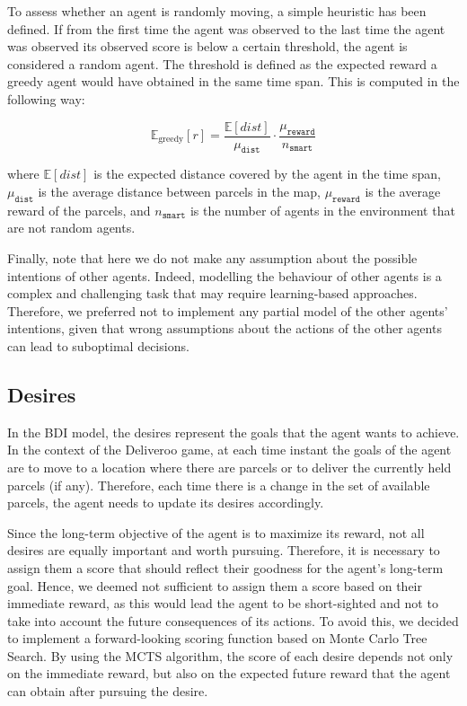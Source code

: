 To assess whether an agent is randomly moving, a simple heuristic has been defined. If from the first time the agent was observed to the last time the agent was observed its observed score is below a certain threshold, the agent is considered a random agent. The threshold is defined as the expected reward a greedy agent would have obtained in the same time span. This is computed in the following way:

\begin{equation*}
    \mathbb{E}_{\text{greedy}}[r] = \frac{\mathbb{E}[dist]}{\mu_{\texttt{dist}}} \cdot \frac{\mu_{\texttt{reward}}}{n_{\texttt{smart}}}
\end{equation*}

where $\mathbb{E}[dist]$ is the expected distance covered by the agent in the time span, $\mu_{\texttt{dist}}$ is the average distance between parcels in the map, $\mu_{\texttt{reward}}$ is the average reward of the parcels, and $n_{\texttt{smart}}$ is the number of agents in the environment that are not random agents.

Finally, note that here we do not make any assumption about the possible intentions of other agents. Indeed, modelling the behaviour of other agents is a complex and challenging task that may require learning-based approaches. Therefore, we preferred not to implement any partial model of the other agents' intentions, given that wrong assumptions about the actions of the other agents can lead to suboptimal decisions.


\subsection{Desires}
\label{sec:desires}

In the BDI model, the desires represent the goals that the agent wants to achieve. In the context of the Deliveroo game, at each time instant the goals of the agent are to move to a location where there are parcels or to deliver the currently held parcels (if any). Therefore, each time there is a change in the set of available parcels, the agent needs to update its desires accordingly.

Since the long-term objective of the agent is to maximize its reward, not all desires are equally important and worth pursuing. Therefore, it is necessary to assign them a score that should reflect their goodness for the agent's long-term goal. Hence, we deemed not sufficient to assign them a score based on their immediate reward, as this would lead the agent to be short-sighted and not to take into account the future consequences of its actions. To avoid this, we decided to implement a forward-looking scoring function based on Monte Carlo Tree Search. By using the MCTS algorithm, the score of each desire depends not only on the immediate reward, but also on the expected future reward that the agent can obtain after pursuing the desire.


